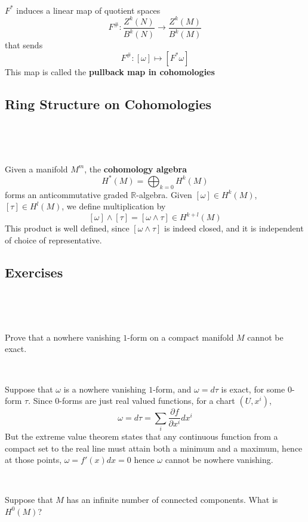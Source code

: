 \documentclass{article}
\begin{document}
\begin{corollary}
  \

  $F^*$ induces a linear map of quotient spaces $$F^\#: \frac{Z^k(N)}{B^k(N)} \to \frac{Z^k(M)}{B^k(M)}$$that sends $$F^\#: [\omega] \mapsto [F^* \omega]$$This map is called the \textbf{pullback map in cohomologies}
\end{corollary}

\subsection{Ring Structure on Cohomologies}
\

\begin{definition}
  \

  Given a manifold $M^m$, the \textbf{cohomology algebra} $$H^*(M) = \bigoplus_{k=0} H^k(M)$$forms an anticommutative graded $\mathbb{R}$-algebra. Given $[\omega] \in H^k(M)$, $[\tau] \in H^l(M)$, we define multiplication by $$[\omega] \wedge [\tau] = [\omega \wedge \tau] \in H^{k+l}(M)$$This product is well defined, since $[\omega \wedge \tau]$ is indeed closed, and it is independent of choice of representative.
\end{definition}

\subsection{Exercises}
\

\begin{exercise}
  \

  Prove that a nowhere vanishing $1$-form on a compact manifold $M$ cannot be exact.
\end{exercise}

\begin{solution}
  \

  Suppose that $\omega$ is a nowhere vanishing $1$-form, and $\omega = d\tau$ is exact, for some $0$-form $\tau$. Since $0$-forms are just real valued functions, for a chart $(U, x^i)$, $$\omega = d\tau = \sum_{i} \frac{\partial f}{\partial x^i} dx^i$$But the extreme value theorem states that any continuous function from a compact set to the real line must attain both a minimum and a maximum, hence at those points, $\omega = f'(x) dx = 0$ hence $\omega$ cannot be nowhere vanishing.
\end{solution}

\begin{exercise}
  \

  Suppose that $M$ has an infinite number of connected components. What is $H^0(M)$?
\end{exercise}
\end{document}
